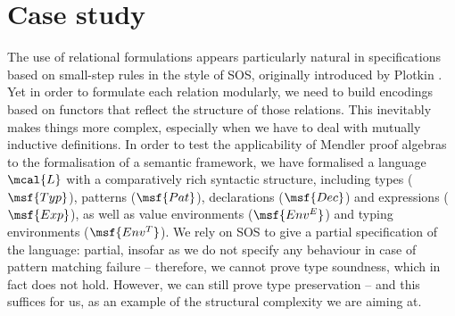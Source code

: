 \documentclass[submission,copyright,creativecommons]{eptcs}
\begin{document}
\section{Case study}  \label{section:three}



The use of relational formulations appears particularly natural in
specifications based on small-step rules in the style of SOS,
originally introduced by Plotkin \cite{Plotkin04a}. Yet in order to
formulate each relation modularly, we need to build encodings based on
functors that reflect the structure of those relations. This
inevitably makes things more complex, especially when we have to deal
with mutually inductive definitions. In order to test the
applicability of Mendler proof algebras to the formalisation of a
semantic framework, we have formalised a language $\mcal{L}$ with a
comparatively rich syntactic structure, including types ($\msf{Typ}$),
patterns ($\msf{Pat}$), declarations ($\msf{Dec}$) and expressions
($\msf{Exp}$), as well as value environments ($\msf{Env^E}$) and
typing environments ($\msf{Env^T}$). We rely on SOS to give a partial
specification of the language: partial, insofar as we do not specify
any behaviour in case of pattern matching failure -- therefore, we
cannot prove type soundness, which in fact does not hold. However, we
can still prove type preservation -- and this suffices for us, as an
example of the structural complexity we are aiming at.
\end{document}

